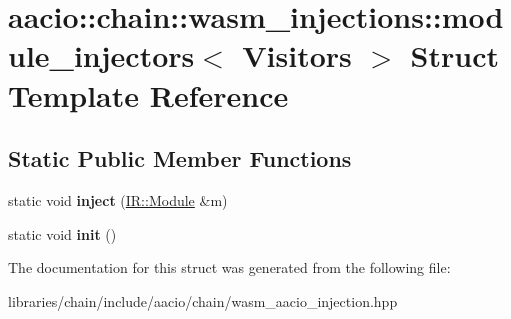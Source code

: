 \hypertarget{structaacio_1_1chain_1_1wasm__injections_1_1module__injectors}{}\section{aacio\+:\+:chain\+:\+:wasm\+\_\+injections\+:\+:module\+\_\+injectors$<$ Visitors $>$ Struct Template Reference}
\label{structaacio_1_1chain_1_1wasm__injections_1_1module__injectors}
\subsection*{Static Public Member Functions}
\begin{DoxyCompactItemize}
\item 
\mbox{\label{structaacio_1_1chain_1_1wasm__injections_1_1module__injectors_aed9a277a70398a1acd75cc16945810fa}} 
static void {\bfseries inject} (\mbox{\hyperlink{struct_i_r_1_1_module}{I\+R\+::\+Module}} \&m)
\item 
\mbox{\label{structaacio_1_1chain_1_1wasm__injections_1_1module__injectors_a93b253133c3edf9e538dff2c36df50a8}} 
static void {\bfseries init} ()
\end{DoxyCompactItemize}


The documentation for this struct was generated from the following file\+:\begin{DoxyCompactItemize}
\item 
libraries/chain/include/aacio/chain/wasm\+\_\+aacio\+\_\+injection.\+hpp\end{DoxyCompactItemize}
